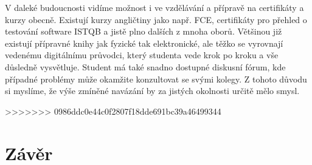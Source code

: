 \documentclass[12pt, a4paper]{report}
\begin{document}
V daleké budoucnosti vidíme možnost i ve vzdělávání a přípravě na certifikáty a kurzy obecně. Existují kurzy angličtiny jako např. FCE, certifikáty pro přehled o testování software ISTQB a jistě plno dalších z mnoha oborů. Většinou již existují přípravné knihy jak fyzické tak elektronické, ale těžko se vyrovnají vedenému digitálnímu průvodci, který studenta vede krok po kroku a vše důsledně vysvětluje. Student má také snadno dostupné diskusní fórum, kde případné problémy může okamžite konzultovat se svými kolegy. Z tohoto důvodu si myslíme, že výše zmíněné navázání by za jistých okolnosti určitě mělo smysl.

>>>>>>> 0986ddc0e44c0f2807f18dde691bc39a46499344
\chapter{Závěr}
\label{sec:org79e1146}
\end{document}
